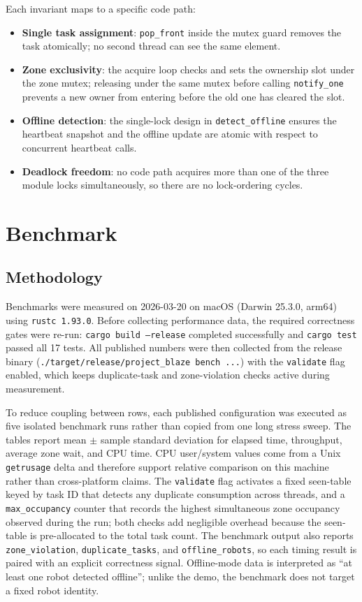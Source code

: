 \documentclass[11pt]{article}
\begin{document}
Each invariant maps to a specific code path:
\begin{itemize}[leftmargin=*]
  \item \textbf{Single task assignment}: \texttt{pop\_front} inside the mutex guard removes the task atomically; no second thread can see the same element.
  \item \textbf{Zone exclusivity}: the acquire loop checks and sets the ownership slot under the zone mutex; releasing under the same mutex before calling \texttt{notify\_one} prevents a new owner from entering before the old one has cleared the slot.
  \item \textbf{Offline detection}: the single-lock design in \texttt{detect\_offline} ensures the heartbeat snapshot and the offline update are atomic with respect to concurrent heartbeat calls.
  \item \textbf{Deadlock freedom}: no code path acquires more than one of the three module locks simultaneously, so there are no lock-ordering cycles.
\end{itemize}

\section{Benchmark}
\subsection{Methodology}
Benchmarks were measured on 2026-03-20 on macOS (Darwin 25.3.0, arm64) using \texttt{rustc 1.93.0}. Before collecting performance data, the required correctness gates were re-run: \texttt{cargo build --release} completed successfully and \texttt{cargo test} passed all 17 tests. All published numbers were then collected from the release binary (\texttt{./target/release/project\_blaze bench ...}) with the \texttt{validate} flag enabled, which keeps duplicate-task and zone-violation checks active during measurement.

To reduce coupling between rows, each published configuration was executed as five isolated benchmark runs rather than copied from one long stress sweep. The tables report mean \(\pm\) sample standard deviation for elapsed time, throughput, average zone wait, and CPU time. CPU user/system values come from a Unix \texttt{getrusage} delta and therefore support relative comparison on this machine rather than cross-platform claims. The \texttt{validate} flag activates a fixed seen-table keyed by task ID that detects any duplicate consumption across threads, and a \texttt{max\_occupancy} counter that records the highest simultaneous zone occupancy observed during the run; both checks add negligible overhead because the seen-table is pre-allocated to the total task count. The benchmark output also reports \texttt{zone\_violation}, \texttt{duplicate\_tasks}, and \texttt{offline\_robots}, so each timing result is paired with an explicit correctness signal. Offline-mode data is interpreted as ``at least one robot detected offline''; unlike the demo, the benchmark does not target a fixed robot identity.
\end{document}
